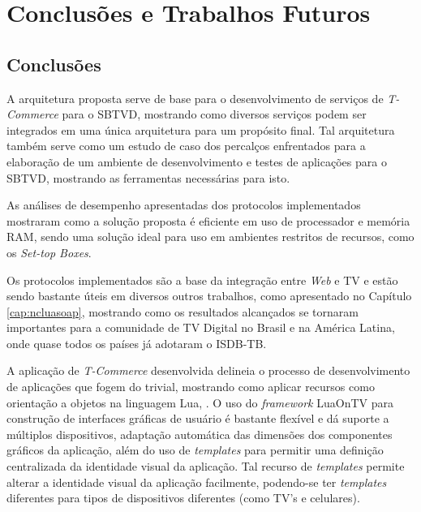 \chapter{Conclusões e Trabalhos Futuros} \label{cap:conclusao}

\section{Conclusões}





A arquitetura proposta serve de base para o desenvolvimento de serviços de \textit{T-Commerce} para o SBTVD,
mostrando como diversos serviços podem ser integrados em uma única arquitetura para um propósito final.
Tal arquitetura também serve como um estudo de caso dos percalços enfrentados para a elaboração
de um ambiente de desenvolvimento e testes de aplicações para o SBTVD, mostrando
as ferramentas necessárias para isto.

As análises de desempenho apresentadas dos protocolos implementados mostraram como a solução proposta
é eficiente em uso de processador e memória RAM, sendo uma solução ideal para uso em 
ambientes restritos de recursos, como os \textit{Set-top Boxes}.

Os protocolos implementados são a base da integração entre \textit{Web} e TV
e estão sendo bastante úteis em diversos outros trabalhos, como apresentado
no Capítulo \ref{cap:ncluasoap}, mostrando como os resultados alcançados se tornaram
importantes para a comunidade de TV Digital no Brasil e na América Latina, 
onde quase todos os países já adotaram o ISDB-TB.

A aplicação de \textit{T-Commerce} desenvolvida delineia o processo de desenvolvimento
de aplicações que fogem do trivial, mostrando como aplicar recursos como orientação
a objetos na linguagem Lua, . 
O uso do \textit{framework} LuaOnTV para construção
de interfaces gráficas de usuário é bastante flexível e dá suporte a múltiplos
dispositivos, adaptação automática das dimensões dos componentes gráficos
da aplicação, além do uso de \textit{templates} para permitir uma 
definição centralizada da identidade visual da aplicação.
Tal recurso de \textit{templates} permite alterar a identidade visual da aplicação facilmente, 
podendo-se ter \textit{templates} diferentes para tipos de dispositivos diferentes (como TV's e celulares).

